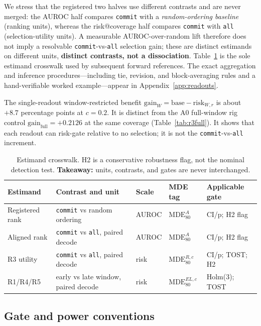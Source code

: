 \documentclass{article}
\begin{document}
We stress that the registered two halves use different contrasts and are never merged: the
AUROC half compares \texttt{commit} with a \emph{random-ordering baseline} (ranking units),
whereas the risk@coverage half compares \texttt{commit} with \texttt{all} (selection-utility
units).  A measurable AUROC-over-random lift therefore does not imply a resolvable
\texttt{commit}-vs-\texttt{all} selection gain; these are distinct estimands on different units,
\textbf{distinct contrasts, not a dissociation}.  Table~\ref{tab:scales} is the sole estimand
crosswalk used by subsequent forward references.  The exact aggregation and inference
procedures---including tie, revision, and block-averaging rules and a hand-verifiable worked
example---appear in Appendix~\ref{app:readouts}.

The single-readout window-restricted benefit
$\mathrm{gain}_{W}=\mathrm{base}-\mathrm{risk}_{W,r}$ is about $+8.7$ percentage points at
$c=0.2$.  It is distinct from the A0 full-window rig control
$\mathrm{gain}_{\mathrm{full}}=+0.2126$ at the same coverage
(Table~\ref{tab:r3full}).  It shows that each readout can risk-gate relative to no selection;
it is not the \texttt{commit}-vs-\texttt{all} increment.

\begin{table}[t]
\caption{Estimand crosswalk.  H2 is a conservative robustness flag, not the nominal detection
test.  \textbf{Takeaway:} units, contrasts, and gates are never interchanged.}
\label{tab:scales}
\centering\small
\begin{tabularx}{\linewidth}{@{}l>{\raggedright\arraybackslash}Xlll@{}}
\toprule
Estimand & Contrast and unit & Scale & MDE tag & Applicable gate \\
\midrule
Registered rank & \texttt{commit} vs random ordering & AUROC & $\mathrm{MDE}_{80}^{A}$ & CI/p; H2 flag \\
Aligned rank & \texttt{commit} vs \texttt{all}, paired decode & AUROC & $\mathrm{MDE}_{80}^{A}$ & CI/p; H2 flag \\
R3 utility & \texttt{commit} vs \texttt{all}, paired decode & risk & $\mathrm{MDE}_{80}^{R,c}$ & CI/p; TOST; H2 \\
R1/R4/R5 & early vs late window, paired decode & risk & $\mathrm{MDE}_{80}^{EL,c}$ & Holm(3); TOST \\
\bottomrule
\end{tabularx}
\end{table}

\subsection{Gate and power conventions}
\label{sec:method:gate}
\end{document}
